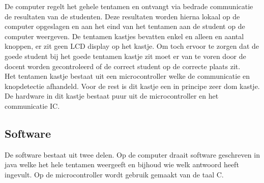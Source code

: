 \documentclass[a4paper,titlepage]{artikel1}
\begin{document}
De computer regelt het gehele tentamen en ontvangt via bedrade communicatie de resultaten van de studenten. Deze resultaten worden hierna lokaal op de computer opgeslagen en aan het eind van het tentamen aan de student op de computer weergeven. De tentamen kastjes bevatten enkel en alleen en aantal knoppen, er zit geen LCD display op het kastje. Om toch ervoor te zorgen dat de goede student bij het goede tentamen kastje zit moet er van te voren door de docent worden gecontroleerd of de correct student op de correcte plaats zit. \\
Het tentamen kastje bestaat uit een microcontroller welke de communicatie en knopdetectie afhandeld. Voor de rest is dit kastje een in principe zeer dom kastje. De hardware in dit kastje bestaat puur uit de microcontroller en het communicatie IC.
\subsection{Software}
De software bestaat uit twee delen. Op de computer draait software geschreven in java welke het hele tentamen weergeeft en bijhoud wie welk antwoord heeft ingevult. Op de microcontroller wordt gebruik gemaakt van de taal C. 
\end{document}
